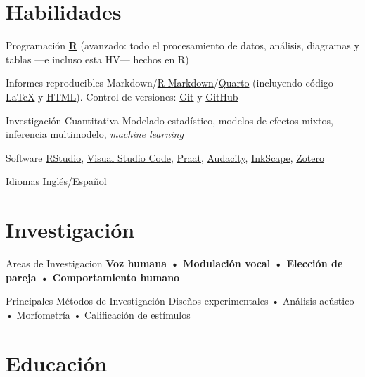 \documentclass[11pt,a4paper,]{awesome-cv}
\begin{document}
\section{Habilidades}\label{habilidades}

\begin{cvskills}
  \cvskill
    {Programación}
    {\href{https://www.r-project.org/}{\textbf{R}} (avanzado: todo el procesamiento de datos, análisis, diagramas y tablas —e incluso esta HV— hechos en R)}

  \cvskill
    {Informes reproducibles}
    {Markdown/\href{https://rmarkdown.rstudio.com/}{R Markdown}/\href{https://quarto.org/}{Quarto} (incluyendo código  \href{https://www.latex-project.org/}{{\selectfont\LaTeX}} y \href{https://html.spec.whatwg.org/}{HTML}). Control de versiones: \href{https://git-scm.com/}{Git} \faGit* y \href{https://github.com/JDLeongomez}{GitHub} \faGithub}

  \cvskill
    {Investigación Cuantitativa}
    {Modelado estadístico, modelos de efectos mixtos, inferencia multimodelo, \textit{machine learning}}

  \cvskill
    {Software}
    {\href{https://posit.co/products/open-source/rstudio/}{RStudio}, \href{https://code.visualstudio.com/}{Visual Studio Code}, \href{https://www.fon.hum.uva.nl/praat/}{Praat}, \href{https://www.audacityteam.org/}{Audacity}, \href{https://inkscape.org/}{InkScape}, \href{https://www.zotero.org/}{Zotero}}

  \cvskill
    {Idiomas}
    {Inglés/Español}
\end{cvskills}

\section{Investigación}\label{investigaciuxf3n}

\begin{cvskills}
  \cvskill
    {Areas de Investigacion}
    {\textbf{Voz humana • Modulación vocal • Elección de pareja • Comportamiento humano}}

  \cvskill
    {Principales Métodos de Investigación}
    {Diseños experimentales • Análisis acústico • Morfometría • Calificación de estímulos}
\end{cvskills}

\section{Educación}\label{educaciuxf3n}
\end{document}
